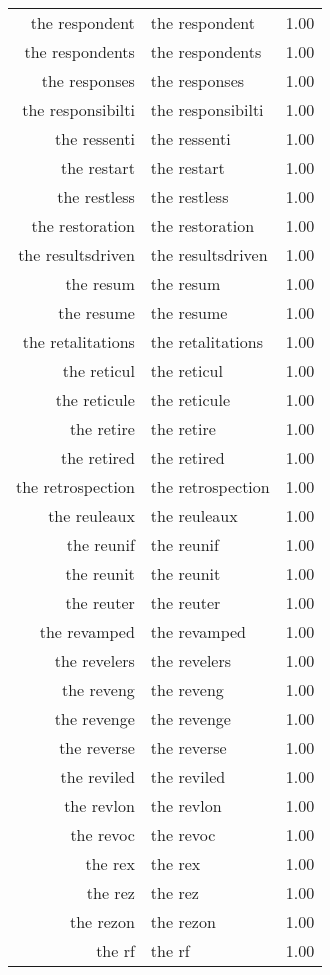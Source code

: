 \begin{table}[ht]
\begin{tabular}{rlr}
  the respondent & the respondent & 1.00 \\ 
  the respondents & the respondents & 1.00 \\ 
  the responses & the responses & 1.00 \\ 
  the responsibilti & the responsibilti & 1.00 \\ 
  the ressenti & the ressenti & 1.00 \\ 
  the restart & the restart & 1.00 \\ 
  the restless & the restless & 1.00 \\ 
  the restoration & the restoration & 1.00 \\ 
  the resultsdriven & the resultsdriven & 1.00 \\ 
  the resum & the resum & 1.00 \\ 
  the resume & the resume & 1.00 \\ 
  the retalitations & the retalitations & 1.00 \\ 
  the reticul & the reticul & 1.00 \\ 
  the reticule & the reticule & 1.00 \\ 
  the retire & the retire & 1.00 \\ 
  the retired & the retired & 1.00 \\ 
  the retrospection & the retrospection & 1.00 \\ 
  the reuleaux & the reuleaux & 1.00 \\ 
  the reunif & the reunif & 1.00 \\ 
  the reunit & the reunit & 1.00 \\ 
  the reuter & the reuter & 1.00 \\ 
  the revamped & the revamped & 1.00 \\ 
  the revelers & the revelers & 1.00 \\ 
  the reveng & the reveng & 1.00 \\ 
  the revenge & the revenge & 1.00 \\ 
  the reverse & the reverse & 1.00 \\ 
  the reviled & the reviled & 1.00 \\ 
  the revlon & the revlon & 1.00 \\ 
  the revoc & the revoc & 1.00 \\ 
  the rex & the rex & 1.00 \\ 
  the rez & the rez & 1.00 \\ 
  the rezon & the rezon & 1.00 \\ 
  the rf & the rf & 1.00 \\ 

\end{tabular}
\end{table}
